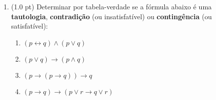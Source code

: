 \documentclass[12pt]{article}
\begin{document}
\begin{enumerate}

\begin{comment}
\item (1.0 pt) Determina o valor lógico das fórmulas abaixo:

\begin{itemize}
\setlength{\itemsep}{-3pt}
\item $-2 < 0 \leftrightarrow \pi^2 < 0 \wedge $ Roma é a capital da Itália
\item $3+4=7 \vee 13 $ é um número primo $\rightarrow \sqrt 16 > 2$
\item $3^2 + 4^2 = 5^2  ~\wedge $ Tóquio não fica no Japão $\rightarrow ( \pi > 2.04 \leftrightarrow 2 \neq 3 )$
\item Na Espanha se fala português $\wedge~ 2^3 - 4 > 5^2 - 10 \vee 5 \neq 3+3$
\end{itemize}
\end{comment}

\item (1.0 pt) Determinar por tabela-verdade se a fórmula abaixo é uma {\bf tautologia}, {\bf contradição} (ou insatisfatível) ou {\bf contingência} (ou satisfatível): 

\begin{enumerate}
\setlength{\itemsep}{-5pt}

\item $(p \leftrightarrow q) \wedge (p \vee q)$

\item $(p \vee q)\rightarrow (p \wedge  q)$


\item $(p \rightarrow (p \rightarrow q)) \rightarrow  q $

\item $(p \rightarrow q) \rightarrow (p \vee r \rightarrow q \vee r)$
\end{enumerate}

%
%
%
%
%
%



\end{enumerate}
\end{document}

